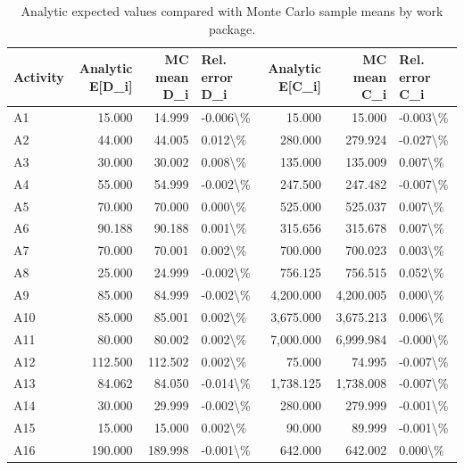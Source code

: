 \begin{table}
\caption{Analytic expected values compared with Monte Carlo sample means by work package.}
\label{tab:workpackage-expected-value-comparison}
\begin{tabular}{lrrlrrl}
\toprule
Activity & Analytic E[D\_i] & MC mean D\_i & Rel. error D\_i & Analytic E[C\_i] & MC mean C\_i & Rel. error C\_i \\
\midrule
A1 & 15.000 & 14.999 & -0.006\textbackslash \% & 15.000 & 15.000 & -0.003\textbackslash \% \\
A2 & 44.000 & 44.005 & 0.012\textbackslash \% & 280.000 & 279.924 & -0.027\textbackslash \% \\
A3 & 30.000 & 30.002 & 0.008\textbackslash \% & 135.000 & 135.009 & 0.007\textbackslash \% \\
A4 & 55.000 & 54.999 & -0.002\textbackslash \% & 247.500 & 247.482 & -0.007\textbackslash \% \\
A5 & 70.000 & 70.000 & 0.000\textbackslash \% & 525.000 & 525.037 & 0.007\textbackslash \% \\
A6 & 90.188 & 90.188 & 0.001\textbackslash \% & 315.656 & 315.678 & 0.007\textbackslash \% \\
A7 & 70.000 & 70.001 & 0.002\textbackslash \% & 700.000 & 700.023 & 0.003\textbackslash \% \\
A8 & 25.000 & 24.999 & -0.002\textbackslash \% & 756.125 & 756.515 & 0.052\textbackslash \% \\
A9 & 85.000 & 84.999 & -0.002\textbackslash \% & 4,200.000 & 4,200.005 & 0.000\textbackslash \% \\
A10 & 85.000 & 85.001 & 0.002\textbackslash \% & 3,675.000 & 3,675.213 & 0.006\textbackslash \% \\
A11 & 80.000 & 80.002 & 0.002\textbackslash \% & 7,000.000 & 6,999.984 & -0.000\textbackslash \% \\
A12 & 112.500 & 112.502 & 0.002\textbackslash \% & 75.000 & 74.995 & -0.007\textbackslash \% \\
A13 & 84.062 & 84.050 & -0.014\textbackslash \% & 1,738.125 & 1,738.008 & -0.007\textbackslash \% \\
A14 & 30.000 & 29.999 & -0.002\textbackslash \% & 280.000 & 279.999 & -0.001\textbackslash \% \\
A15 & 15.000 & 15.000 & 0.002\textbackslash \% & 90.000 & 89.999 & -0.001\textbackslash \% \\
A16 & 190.000 & 189.998 & -0.001\textbackslash \% & 642.000 & 642.002 & 0.000\textbackslash \% \\

\end{tabular}
\end{table}
